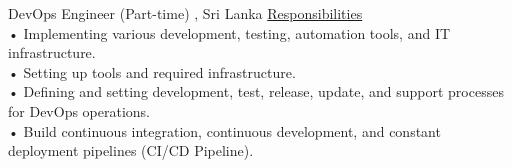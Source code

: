 \documentclass{cv}
\begin{document}
\break
{}
{DevOps Engineer (Part-time)}
{\keeneye, Sri Lanka}
{
    \underline {Responsibilities}\vspace{.2cm}\\
    • Implementing various development, testing, automation tools, and IT infrastructure.\\
    • Setting up tools and required infrastructure.\\
    • Defining and setting development, test, release, update, and support processes for DevOps operations.\\
    • Build continuous integration, continuous development, and constant deployment pipelines (CI/CD Pipeline).
  }
\end{document}

